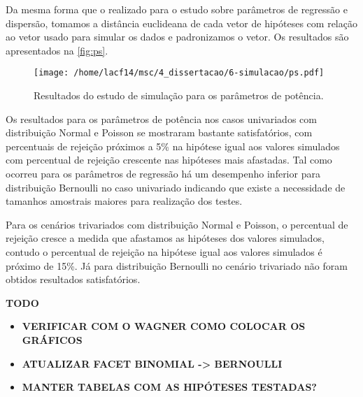 Da mesma forma que o realizado para o estudo sobre parâmetros de regressão e dispersão, tomamos a distância euclideana de cada vetor de hipóteses com relação ao vetor usado para simular os dados e padronizamos o vetor. Os resultados são apresentados na \autoref{fig:ps}.

\begin{figure}[H]
\centering
\texttt{[image: /home/lacf14/msc/4\_dissertacao/6-simulacao/ps.pdf]}
\caption{Resultados do estudo de simulação para os parâmetros de potência.}
\label{fig:ps}
\end{figure}

Os resultados para os parâmetros de potência nos casos univariados com distribuição Normal e Poisson se mostraram bastante satisfatórios, com percentuais de rejeição próximos a 5\% na hipótese igual aos valores simulados com percentual de rejeição crescente nas hipóteses mais afastadas. Tal como ocorreu para os parâmetros de regressão há um desempenho inferior para distribuição Bernoulli no caso univariado indicando que existe a necessidade de tamanhos amostrais maiores para realização dos testes.

Para os cenários trivariados com distribuição Normal e Poisson, o percentual de rejeição cresce a medida que afastamos as hipóteses dos valores simulados, contudo o percentual de rejeição na hipótese igual aos valores simulados é próximo de 15\%. Já para distribuição Bernoulli no cenário trivariado não foram obtidos resultados satisfatórios.


\textbf{TODO}

\begin{itemize}

  \item \textbf{VERIFICAR COM O WAGNER COMO COLOCAR OS GRÁFICOS}

  \item \textbf{ATUALIZAR FACET BINOMIAL -> BERNOULLI}

  \item \textbf{MANTER TABELAS COM AS HIPÓTESES TESTADAS?}

\end{itemize}

